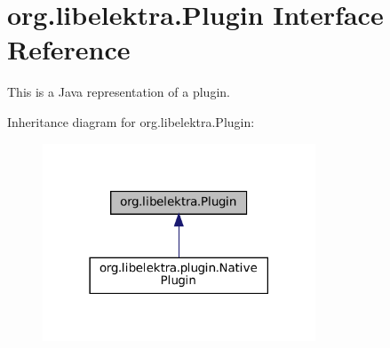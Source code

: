 \hypertarget{interfaceorg_1_1libelektra_1_1Plugin}{}\section{org.\+libelektra.\+Plugin Interface Reference}
\label{interfaceorg_1_1libelektra_1_1Plugin}


This is a Java representation of a plugin.  




Inheritance diagram for org.\+libelektra.\+Plugin\+:
\nopagebreak
\begin{figure}[H]
\begin{center}
\leavevmode
\includegraphics[width=230pt]{interfaceorg_1_1libelektra_1_1Plugin__inherit__graph}
\end{center}
\end{figure}
